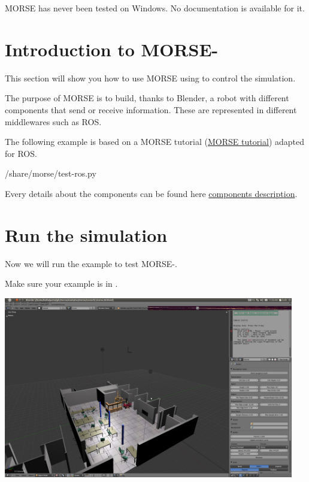 MORSE has never been tested on Windows. No documentation is available for it.

\section{Introduction to MORSE-\urbi}

This section will show you how to use MORSE using \urbi to
control the simulation.

The purpose of MORSE is to build, thanks to Blender, a robot with different
components that send or receive information. These are represented in
different middlewares such as ROS.

The following example is based on a MORSE tutorial
(\href{http://www.openrobots.org/morse/doc/latest/user/tutorial.html} {MORSE
  tutorial}) adapted for ROS.

{\cxxPre%

  {\absTopSrcdir/share/morse/test-ros.py}%
\cxxPost}

Every details about the components can be found here
\href{http://www.openrobots.org/morse/doc/latest/components_library.html}
{components description}.

\section{Run the simulation}

Now we will run the example to test MORSE-\urbi.

Make sure your example is in
.

\includegraphics[width=0.95\textwidth]{img/morse/simulation.png}

